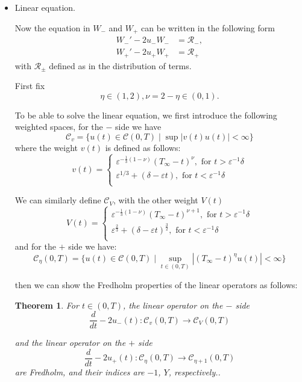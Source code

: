 \documentclass[letterpaper,11pt]{article}
\newcommand{\eps}{\varepsilon}
\numberwithin{equation}{section}
\theoremstyle{plain}
\newtheorem{theorem}{Theorem}[section]
\begin{document}
\begin{itemize}
\pagebreak
\item Linear equation.

Now the equation in $W_-$ and $W_+$ can be written in the following form
\begin{align*}
W_-' - 2u_- W_- &= \mathcal{R}_- ,\\
W_+' - 2u_+ W_+ &= \mathcal{R}_+
\end{align*}
with $\mathcal{R}_{\pm}$ defined as in the distribution of terms.

First fix
\[
\eta \in (1,2), \nu = 2-\eta\in (0,1).
\]

To be able to solve the linear equation, we first introduce the following weighted spaces, for the $-$ side we have
\[
\mathcal{C}_v = \{u(t) \in \mathcal{C}(0,T) \mid \sup |v(t) u(t)| < \infty\}
\]
where the weight $v(t)$ is defined as follows:
\[
v(t)=
\begin{cases}
\eps^{-\frac{1}{3}(1-\nu)} (T_\infty-t)^\nu, \text{ for }t> \eps^{-1}\delta\\
\eps^{1/3}+(\delta-\eps t), \text{ for }t < \eps^{-1}\delta\\
\end{cases}
\]

We can similarly define $\mathcal{C}_V$, with the other weight $V(t)$ 
\[
V(t)=
\begin{cases}
\eps^{-\frac{1}{3}(1-\nu)} (T_\infty-t)^{\nu+1}, \text{ for }t> \eps^{-1}\delta\\
\eps^{\frac{2}{3}}+(\delta - \eps t)^{\frac{3}{2}}, \text{ for }t < \eps^{-1}\delta\\
\end{cases}
\]
and for the $+$ side we have:
\[
\mathcal{C}_\eta(0,T) = \{ u(t) \in \mathcal{C}(0,T) \mid \sup_{t\in (0,T)}|(T_\infty - t)^{\eta} u(t)| < \infty  \}
\]



then we can show the Fredholm properties of the linear operators as follows: 
\begin{theorem}
For $t \in (0,T)$, the linear operator on the $-$ side
\[
\frac{d}{dt} - 2u_-(t) : \mathcal{C}_v (0,T) \to \mathcal{C}_V (0,T)
\]

and the linear operator on the $+$ side
\[
\frac{d}{dt}  - 2u_+(t) : \mathcal{C}_\eta (0,T) \to \mathcal{C}_{\eta+1}(0,T)
\]
are Fredholm, and their indices are $-1$, $Y$, respectively..
\end{theorem}


\end{itemize}
\end{document}
